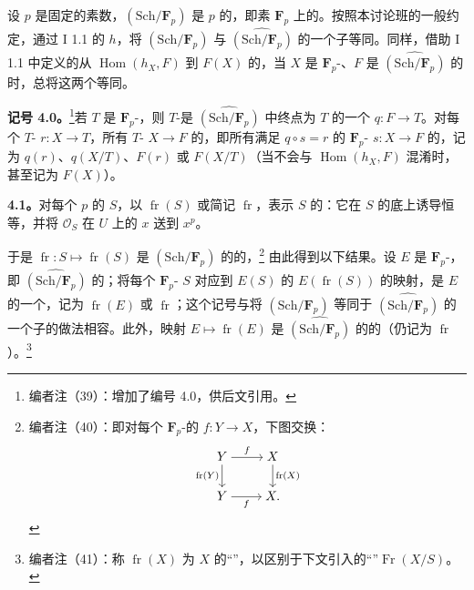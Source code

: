 设 $p$ 是固定的素数，$(\mathrm{Sch}/\mathbf F_p)$ 是 $p$ 的，即素 $\mathbf F_p$ 上的。按照本讨论班的一般约定，通过 I 1.1 的 $h$，将 $(\mathrm{Sch}/\mathbf F_p)$ 与 $\widehat{(\mathrm{Sch}/\mathbf F_p)}$ 的一个子等同。同样，借助 I 1.1 中定义的从 $\operatorname{Hom}(h_X,F)$ 到 $F(X)$ 的，当 $X$ 是 $\mathbf F_p$-、$F$ 是 $\widehat{(\mathrm{Sch}/\mathbf F_p)}$ 的时，总将这两个等同。

\textbf{记号 4.0。}\footnote{编者注（39）：增加了编号 4.0，供后文引用。}若 $T$ 是 $\mathbf F_p$-，则 $T$-是 $\widehat{(\mathrm{Sch}/\mathbf F_p)}$ 中终点为 $T$ 的一个 $q:F\to T$。对每个 $T$- $r:X\to T$，所有 $T$- $X\to F$ 的，即所有满足 $q\circ s=r$ 的 $\mathbf F_p$- $s:X\to F$ 的，记为 $q(r)$、$q(X/T)$、$F(r)$ 或 $F(X/T)$（当不会与 $\operatorname{Hom}(h_X,F)$ 混淆时，甚至记为 $F(X)$）。

\textbf{4.1。}对每个 $p$ 的 $S$，以 $\operatorname{fr}(S)$ 或简记 $\operatorname{fr}$，表示 $S$ 的：它在 $S$ 的底上诱导恒等，并将 $\mathcal O_S$ 在 $U$ 上的 $x$ 送到 $x^p$。

于是 $\operatorname{fr}:S\mapsto\operatorname{fr}(S)$ 是 $(\mathrm{Sch}/\mathbf F_p)$ 的的，\footnote{编者注（40）：即对每个 $\mathbf F_p$-的 $f:Y\to X$，下图交换：
\[
\begin{tikzcd}[ampersand replacement=\&,cramped]
Y\arrow[r,"f"]\arrow[d,"\operatorname{fr}(Y)"']\&X\arrow[d,"\operatorname{fr}(X)"]\\
Y\arrow[r,"f"']\&X.
\end{tikzcd}
\]}
由此得到以下结果。设 $E$ 是 $\mathbf F_p$-，即 $\widehat{(\mathrm{Sch}/\mathbf F_p)}$ 的；将每个 $\mathbf F_p$- $S$ 对应到 $E(S)$ 的 $E(\operatorname{fr}(S))$ 的映射，是 $E$ 的一个，记为 $\operatorname{fr}(E)$ 或 $\operatorname{fr}$；这个记号与将 $(\mathrm{Sch}/\mathbf F_p)$ 等同于 $\widehat{(\mathrm{Sch}/\mathbf F_p)}$ 的一个子的做法相容。此外，映射 $E\mapsto\operatorname{fr}(E)$ 是 $\widehat{(\mathrm{Sch}/\mathbf F_p)}$ 的的（仍记为 $\operatorname{fr}$）。\footnote{编者注（41）：称 $\operatorname{fr}(X)$ 为 $X$ 的“”，以区别于下文引入的“”$\operatorname{Fr}(X/S)$。}

